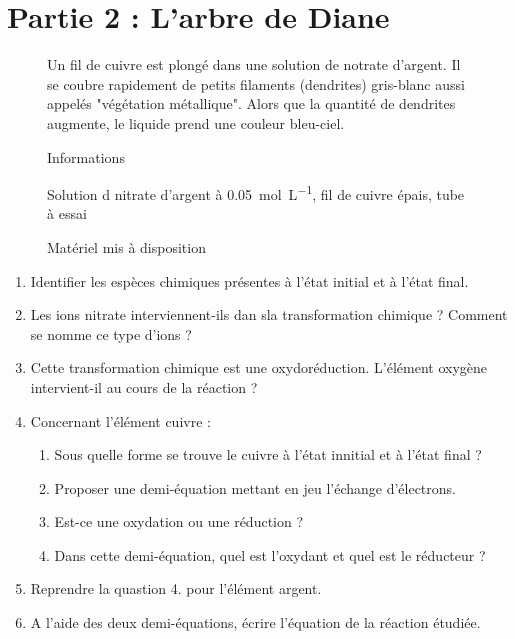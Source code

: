 \documentclass[a4paper,12pt,fleqn]{article}%
\begin{document}
\section*{Partie 2 : L'arbre de Diane}
\begin{figure}[h!]
    \caption{Informations}
    Un fil de cuivre est plongé dans une solution de notrate d'argent. Il se coubre rapidement de petits filaments (dendrites) gris-blanc aussi appelés "végétation métallique". Alors que la quantité de dendrites augmente, le liquide prend une couleur bleu-ciel.
\end{figure}
\begin{figure}[h!]
    \caption{Matériel mis à disposition}
    Solution d nitrate d'argent à \SI{0,05}{\mole\per\liter}, fil de cuivre épais, tube à essai
\end{figure}
\begin{enumerate}
    \item Identifier les espèces chimiques présentes à l'état initial et à l'état final.
    \item Les ions nitrate interviennent-ils dan sla transformation chimique ? Comment se nomme ce type d'ions ?
    \item Cette transformation chimique est une oxydoréduction. L'élément oxygène intervient-il au cours de la réaction ?
    \item Concernant l'élément cuivre :
    \begin{enumerate}
        \item Sous quelle forme se trouve le cuivre à l'état innitial et à l'état final ?
        \item Proposer une demi-équation mettant en jeu l'échange d'électrons.
        \item Est-ce une oxydation ou une réduction ?
        \item Dans cette demi-équation, quel est l'oxydant et quel est le réducteur ?
    \end{enumerate}
    \item Reprendre la quastion 4. pour l'élément argent.
    \item A l'aide des deux demi-équations, écrire l'équation de la réaction étudiée.
\end{enumerate}
\end{document}
